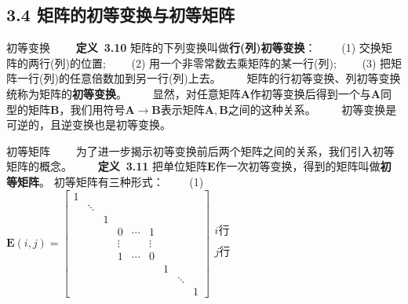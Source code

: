 \documentclass[compress,mathserif,cjk]{beamer}
\theoremstyle{remark}
\numberwithin{equation}{section}
\newcommand{\hei}{\bf}      %
\begin{document}
\begin{CJK}{UTF8}{gbsn}
\section[3.4]{3.4 矩阵的初等变换与初等矩阵}

\begin{frame}{初等变换}
 \ \ \ \ {\hei 定义~3.10} 矩阵的下列变换叫做{\hei 行(列)初等变换}：
 \vskip 5pt
 \ \ \ \ (1) 交换矩阵的两行(列)的位置;
 \vskip 5pt
 \ \ \ \ (2) 用一个非零常数去乘矩阵的某一行(列);
 \vskip 5pt
 \ \ \ \ (3) 把矩阵一行(列)的任意倍数加到另一行(列)上去。
 \vskip 5pt
 \ \ \ \ 矩阵的行初等变换、列初等变换统称为矩阵的{\hei 初等变换}。
 \pause\vskip 10pt
 \ \ \ \ 显然，对任意矩阵$\bm A$作初等变换后得到一个与$\bm A$同型的矩阵$\bm B$，我们用符号$\bm A\rightarrow\bm B$表示矩阵$\bm A,\bm B$之间的这种关系。
 \pause\vskip 10pt
 \ \ \ \
 初等变换是可逆的，且逆变换也是初等变换。
\end{frame}

\begin{frame}{初等矩阵}
 \ \ \ \ 为了进一步揭示初等变换前后两个矩阵之间的关系，我们引入初等矩阵的概念。
 \vskip 3pt
 \ \ \ \ {\hei 定义~3.11} 把单位矩阵$\bm E$作一次初等变换，得到的矩阵叫做{\hei 初等矩阵}。 \pause 初等矩阵有三种形式：
\vskip 5pt
 \ \ \ \ (1) $\bm E(i,j)=\left[\begin{matrix}1&&&&&&&&\\ &\ddots&&&&&&&\\&&1&&&&&&\\&&&0&\cdots&1&&&\\&&&\vdots&&\vdots&&&\\ &&&1&\cdots&0&&&\\&&&&&&1&&\\&&&&&&&\ddots&\\&&&&&&&&1\end{matrix}\right]
 \begin{matrix} \\i\mbox{行}\\ \\j\mbox{行}\\ \\\end{matrix}$

\end{frame}


\end{CJK}
\end{document}
